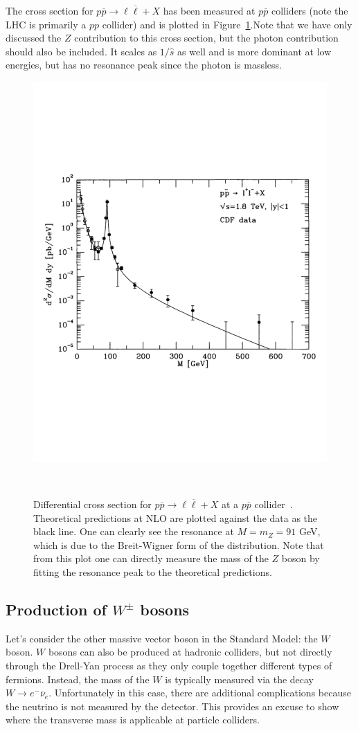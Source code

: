 \documentclass[11pt, oneside]{article}   	%
\theoremstyle{definition}
\numberwithin{equation}{subsection}		%
\begin{document}
The cross section for $p\overline p\rightarrow\ell\overline\ell + X$ has been measured at $p\overline p$ colliders (note the LHC is primarily a 
$pp$ collider) and is plotted in Figure~\ref{fig:lepton_production_drell_yan}.Note that we have only discussed the $Z$ contribution to this 
cross section, but the photon contribution should also be included. It scales as $1 / \hat s$ as well and is more dominant at low energies, but 
has no resonance peak since the photon is massless. 
\begin{figure}[H]
	\centering
	\includegraphics[width = .6\textwidth]{lepton_production_drell_yan}
	\caption{Differential cross section for $p\overline p\rightarrow\ell\overline\ell + X$ at a $p\overline p$ collider~\cite{ellis}. 
	Theoretical predictions at NLO are plotted against the data as the black line. One can clearly see the resonance at $M = m_Z = 91$ GeV, 
	which is due to the Breit-Wigner form of the distribution. Note that from this plot one can directly measure the mass of the $Z$ boson by 
	fitting the resonance peak to the theoretical predictions.}~
	\label{fig:lepton_production_drell_yan}
\end{figure}

\subsection{Production of $W^\pm$ bosons}

Let's consider the other massive vector boson in the Standard Model: the $W$ boson. $W$ bosons can also be produced at hadronic 
colliders, but not directly through the Drell-Yan process as they only couple together different types of fermions. Instead, the mass of the 
$W$ is typically measured via the decay $W\rightarrow e^-\overline\nu_e$. Unfortunately in this case, there are additional complications 
because the neutrino is not measured by the detector. This provides an excuse to show where the transverse mass is applicable at 
particle colliders. 
\end{document}
